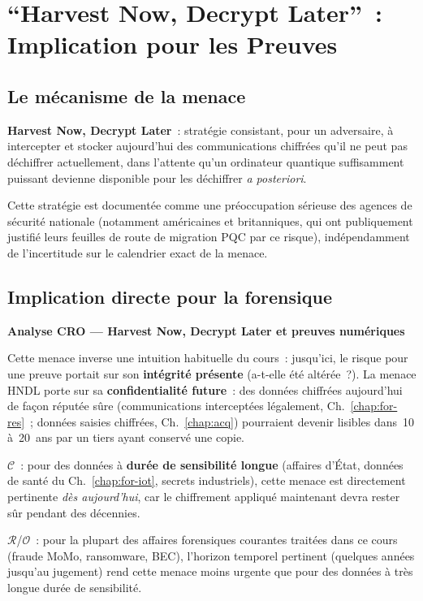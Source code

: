 \section{``Harvest Now, Decrypt Later''~: Implication pour les Preuves}
\label{sec:harvest-now}

\subsection{Le mécanisme de la menace}

\begin{boxdef}
\textbf{Harvest Now, Decrypt Later}~:
stratégie consistant, pour un adversaire, à intercepter et stocker
aujourd'hui des communications chiffrées qu'il ne peut pas
déchiffrer actuellement, dans l'attente qu'un ordinateur quantique
suffisamment puissant devienne disponible pour les déchiffrer
\textit{a posteriori}.
\end{boxdef}

Cette stratégie est documentée comme une préoccupation sérieuse
des agences de sécurité nationale (notamment américaines et
britanniques, qui ont publiquement justifié leurs feuilles de
route de migration PQC par ce risque), indépendamment de
l'incertitude sur le calendrier exact de la menace.

\subsection{Implication directe pour la forensique}

\begin{boxCRO}
\textbf{Analyse CRO --- Harvest Now, Decrypt Later et preuves numériques}

Cette menace inverse une intuition habituelle du cours~: jusqu'ici,
le risque pour une preuve portait sur son \textbf{intégrité présente}
(a-t-elle été altérée~?). La menace HNDL porte sur sa
\textbf{confidentialité future}~: des données chiffrées aujourd'hui
de façon réputée sûre (communications interceptées légalement,
Ch.~\ref{chap:for-res}~; données saisies chiffrées, Ch.~\ref{chap:acq})
pourraient devenir lisibles dans~10 à~20~ans par un tiers ayant
conservé une copie.

$\mathcal{C}$~: pour des données à \textbf{durée de sensibilité
longue} (affaires d'État, données de santé du Ch.~\ref{chap:for-iot},
secrets industriels), cette menace est directement pertinente
\emph{dès aujourd'hui}, car le chiffrement appliqué maintenant
devra rester sûr pendant des décennies.

$\mathcal{R}$/$\mathcal{O}$~: pour la plupart des affaires
forensiques courantes traitées dans ce cours (fraude MoMo,
ransomware, BEC), l'horizon temporel pertinent
(quelques années jusqu'au jugement) rend cette menace moins
urgente que pour des données à très longue durée de sensibilité.

\end{boxCRO}

